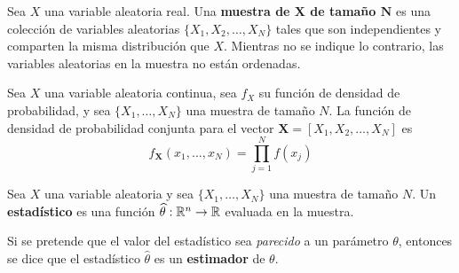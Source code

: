 \begin{definicion}
Sea $X$ una variable aleatoria real. Una \textbf{muestra de $\boldsymbol{X}$ de tamaño $\boldsymbol{N}$} es una colección de variables aleatorias $\{ X_1, X_2, \dots, X_N \}$ tales que son independientes y comparten la misma distribución que $X$.
%
Mientras no se indique lo contrario, las variables aleatorias en la muestra no están ordenadas.
\end{definicion}

\begin{proposicion}
Sea $X$ una variable aleatoria continua, sea $f_X$ su función de densidad de probabilidad, y sea $\{ X_1, \dots, X_N \}$ una muestra de tamaño $N$. 
%
La función de densidad de probabilidad conjunta para el vector $\boldsymbol{X}=[ X_1, X_2, \dots, X_N ]$ es
\begin{equation}
f_{\boldsymbol{X}}(x_1, \dots, x_N ) = \prod_{j=1}^{N} f(x_j)
\end{equation}
\label{oculto1}
\end{proposicion}

\begin{definicion}
Sea $X$ una variable aleatoria y sea $\{ X_1, \dots, X_N \}$ una muestra de tamaño $N$.
%
Un \textbf{estadístico} es una función $\widehat{\theta}: \mathbb{R}^{n}\rightarrow\mathbb{R}$ evaluada en la muestra.

Si se pretende que el valor del estadístico sea \textit{parecido} a un parámetro $\theta$, entonces se dice que el estadístico $\widehat{\theta}$ es un \textbf{estimador} de $\theta$.
\end{definicion}



